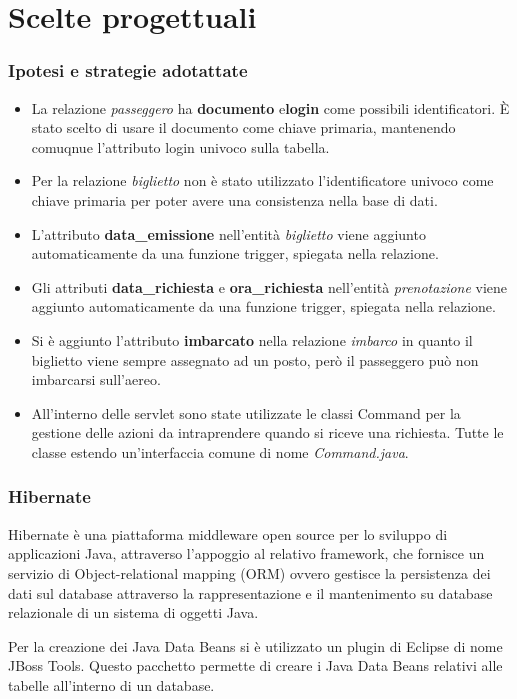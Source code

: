 \documentclass[a4paper,10pt]{article}
\begin{document}
\part{Scelte progettuali}
  
 \section{Ipotesi e strategie adotattate}
  \begin{itemize}
   \item La relazione \textit{passeggero} ha \textbf{documento} e\textbf{login} come possibili identificatori. \`E stato scelto di usare il documento come chiave primaria, mantenendo comuqnue
   l'attributo login univoco sulla tabella.
   \item Per la relazione \textit{biglietto} non \`e stato utilizzato l'identificatore univoco come chiave primaria per poter avere una consistenza nella base di dati.
   \item L'attributo \textbf{data\_emissione} nell'entit\`a \textit{biglietto} viene aggiunto automaticamente da una funzione trigger, spiegata nella relazione.
   \item Gli attributi \textbf{data\_richiesta} e \textbf{ora\_richiesta} nell'entit\`a \textit{prenotazione} viene aggiunto automaticamente da una funzione trigger, spiegata nella relazione.
   \item Si \`e aggiunto l'attributo \textbf{imbarcato} nella relazione \textit{imbarco} in quanto il biglietto viene sempre assegnato ad un posto, per\`o il passeggero pu\`o non imbarcarsi sull'aereo.
   \item All'interno delle servlet sono state utilizzate le classi Command per la gestione delle azioni da intraprendere quando si riceve una richiesta. Tutte le classe estendo un'interfaccia comune di nome \textit{Command.java}.
  \end{itemize} 


 \section{Hibernate}
 Hibernate \`e una piattaforma middleware open source per lo sviluppo di applicazioni Java, 
 attraverso l'appoggio al relativo framework, che fornisce un servizio di Object-relational mapping (ORM) ovvero gestisce la persistenza dei dati 
 sul database attraverso la rappresentazione e il mantenimento su database relazionale di un sistema di oggetti Java.
 
 Per la creazione dei Java Data Beans si \`e utilizzato un plugin di Eclipse di nome JBoss Tools. Questo pacchetto permette di creare i Java Data Beans relativi alle tabelle all'interno di un database.
 
\end{document}
